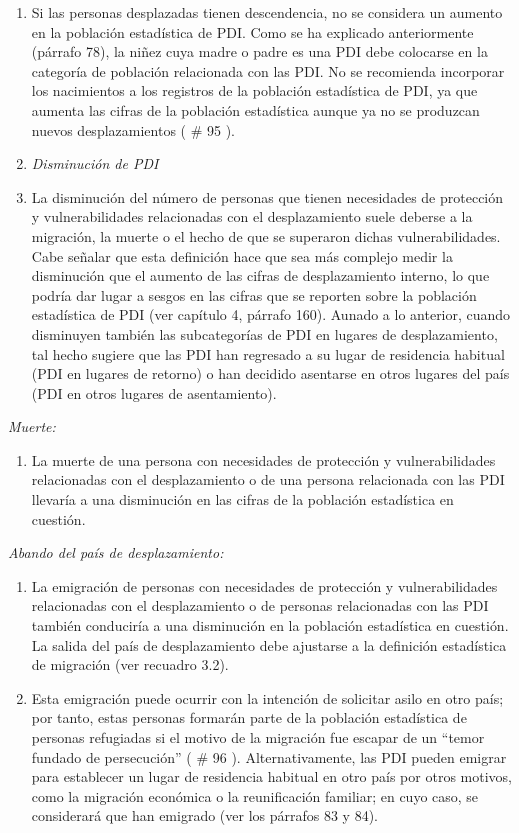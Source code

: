 \documentclass[
]{book}
\providecommand{\tightlist}{%
  \setlength{\itemsep}{0pt}\setlength{\parskip}{0pt}}
\begin{document}
\begin{enumerate}
\item
  Si las personas desplazadas tienen descendencia, no se considera un aumento en la población estadística de PDI. Como se ha explicado anteriormente (párrafo 78), la niñez cuya madre o padre es una PDI debe colocarse en la categoría de población relacionada con las PDI. No se recomienda incorporar los nacimientos a los registros de la población estadística de PDI, ya que aumenta las cifras de la población estadística aunque ya no se produzcan nuevos desplazamientos (
  \# 95
  ).
\item
  \emph{Disminución de PDI}
\item
  La disminución del número de personas que tienen necesidades de protección y vulnerabilidades relacionadas con el desplazamiento suele deberse a la migración, la muerte o el hecho de que se superaron dichas vulnerabilidades. Cabe señalar que esta definición hace que sea más complejo medir la disminución que el aumento de las cifras de desplazamiento interno, lo que podría dar lugar a sesgos en las cifras que se reporten sobre la población estadística de PDI (ver capítulo 4, párrafo 160). Aunado a lo anterior, cuando disminuyen también las subcategorías de PDI en lugares de desplazamiento, tal hecho sugiere que las PDI han regresado a su lugar de residencia habitual (PDI en lugares de retorno) o han decidido asentarse en otros lugares del país (PDI en otros lugares de asentamiento).
\end{enumerate}

\emph{Muerte:}

\begin{enumerate}
\def\labelenumi{\arabic{enumi}.}
\tightlist
\item
  La muerte de una persona con necesidades de protección y vulnerabilidades relacionadas con el desplazamiento o de una persona relacionada con las PDI llevaría a una disminución en las cifras de la población estadística en cuestión.
\end{enumerate}

\emph{Abando del país de desplazamiento:}

\begin{enumerate}
\def\labelenumi{\arabic{enumi}.}
\tightlist
\item
  La emigración de personas con necesidades de protección y vulnerabilidades relacionadas con el desplazamiento o de personas relacionadas con las PDI también conduciría a una disminución en la población estadística en cuestión. La salida del país de desplazamiento debe ajustarse a la definición estadística de migración (ver recuadro 3.2).
\item
  Esta emigración puede ocurrir con la intención de solicitar asilo en otro país; por tanto, estas personas formarán parte de la población estadística de personas refugiadas si el motivo de la migración fue escapar de un ``temor fundado de persecución'' (
  \# 96
  ). Alternativamente, las PDI pueden emigrar para establecer un lugar de residencia habitual en otro país por otros motivos, como la migración económica o la reunificación familiar; en cuyo caso, se considerará que han emigrado (ver los párrafos 83 y 84).
\end{enumerate}
\end{document}
